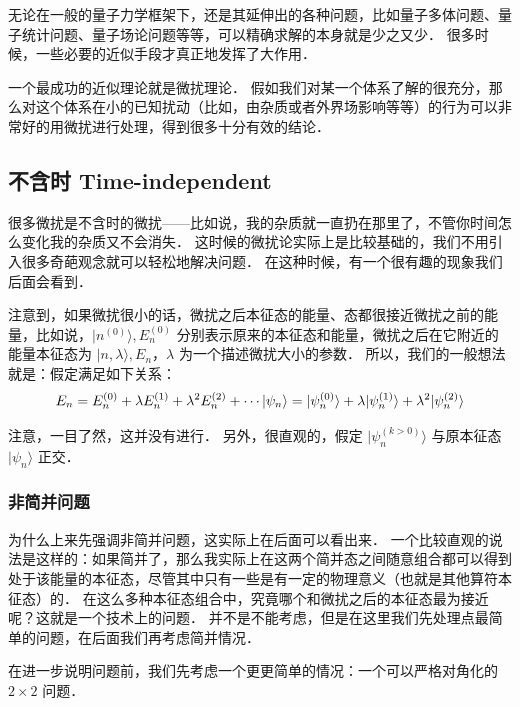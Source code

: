 
无论在一般的量子力学框架下，还是其延伸出的各种问题，比如量子多体问题、量子统计问题、量子场论问题等等，可以精确求解的本身就是少之又少． 很多时候，一些必要的近似手段才真正地发挥了大作用．

一个最成功的近似理论就是微扰理论． 假如我们对某一个体系了解的很充分，那么对这个体系在小的已知扰动（比如，由杂质或者外界场影响等等）的行为可以非常好的用微扰进行处理，得到很多十分有效的结论．

\subsection{不含时 Time-independent}

很多微扰是不含时的微扰——比如说，我的杂质就一直扔在那里了，不管你时间怎么变化我的杂质又不会消失． 这时候的微扰论实际上是比较基础的，我们不用引入很多奇葩观念就可以轻松地解决问题． 在这种时候，有一个很有趣的现象我们后面会看到．

注意到，如果微扰很小的话，微扰之后本征态的能量、态都很接近微扰之前的能量，比如说，$|n^{(0)}\rangle, E_n^{(0)}$ 分别表示原来的本征态和能量，微扰之后在它附近的能量本征态为 $|n,\lambda\rangle, E_n$，$\lambda$ 为一个描述微扰大小的参数． 所以，我们的一般想法就是：假定满足如下关系：
\begin{equation}
E_n = E_n^{(0)} + \lambda E_n^{(1)} + \lambda^2 E_n^{(2)} + \cdots\\
|\psi_n\rangle = |\psi_n^{(0)}\rangle + \lambda|\psi_n^{(1)}\rangle + \lambda^2 |\psi_n^{(2)}\rangle
\end{equation}

注意，一目了然，这并没有进行． 另外，很直观的，假定 $|\psi_n^{(k>0)}\rangle$ 与原本征态 $|\psi_n\rangle$ 正交．

\subsubsection{非简并问题}

为什么上来先强调非简并问题，这实际上在后面可以看出来． 一个比较直观的说法是这样的：如果简并了，那么我实际上在这两个简并态之间随意组合都可以得到处于该能量的本征态，尽管其中只有一些是有一定的物理意义（也就是其他算符本征态）的． 在这么多种本征态组合中，究竟哪个和微扰之后的本征态最为接近呢？这就是一个技术上的问题． 并不是不能考虑，但是在这里我们先处理点最简单的问题，在后面我们再考虑简并情况．

在进一步说明问题前，我们先考虑一个更更简单的情况：一个可以严格对角化的 $2\times2$ 问题．

